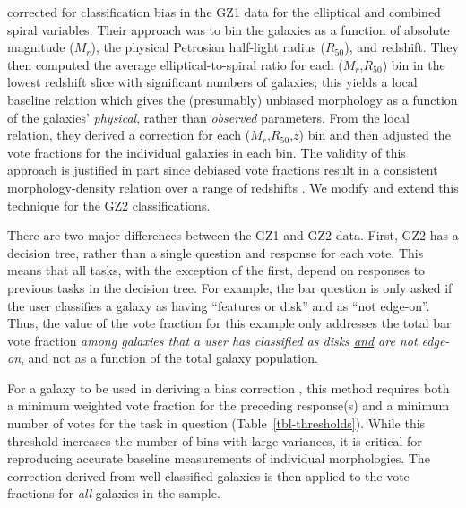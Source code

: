 \documentclass[useAMS,usenatbib]{mn2e}
\newcommand{\mr}{$M_r$}
\newcommand{\rfifty}{$R_{50}$}
\providecommand{\DIFaddtex}[1]{{\protect\color{blue}\uwave{#1}}} %
\providecommand{\DIFaddbegin}{} %
\providecommand{\DIFaddend}{} %
\providecommand{\DIFadd}[1]{\texorpdfstring{\DIFaddtex{#1}}{#1}} %
\begin{document}
\citet{bam09} corrected for classification bias in the GZ1 data for the elliptical and combined spiral variables. Their approach was to bin the galaxies as a function of absolute magnitude (\mr), the physical Petrosian half-light radius (\rfifty), and redshift. They then computed the average elliptical-to-spiral ratio for each (\mr,\rfifty) bin in the lowest redshift slice with significant numbers of galaxies; this yields a local baseline relation which gives the (presumably) unbiased morphology as a function of the galaxies' {\em physical}, rather than {\em observed} parameters. From the local relation, they derived a correction for each (\mr,\rfifty,$z$) bin and then adjusted the vote fractions for the individual galaxies in each bin. The validity of this approach is justified in part since debiased vote fractions result in a consistent morphology-density relation over a range of redshifts \citep{bam09}. We modify and extend this technique for the GZ2 classifications. 

There are two major differences between the GZ1 and GZ2 data. First, GZ2 has a decision tree, rather than a single question and response for each vote. This means that all tasks, with the exception of the first, depend on responses to previous tasks in the decision tree. For example, the bar question is only asked if the user classifies a galaxy as having ``features or disk'' and as ``not edge-on''. Thus, the value of the vote fraction for this example only addresses the total bar vote fraction {\em among galaxies that a user has classified as disks \underline{and} are not edge-on}, and not as a function of the total galaxy population. 

For a galaxy to be used in deriving a bias correction \DIFaddbegin \DIFadd{for a particular task}\DIFaddend , this method requires both a minimum weighted vote fraction for the preceding response(s) and a minimum number of votes for the task in question (Table~\ref{tbl-thresholds}). While this threshold increases the number of bins with large variances, it is critical for reproducing accurate baseline measurements of individual morphologies. The correction derived from well-classified galaxies is then applied to the vote fractions for {\em all} galaxies in the sample. 
\end{document}
